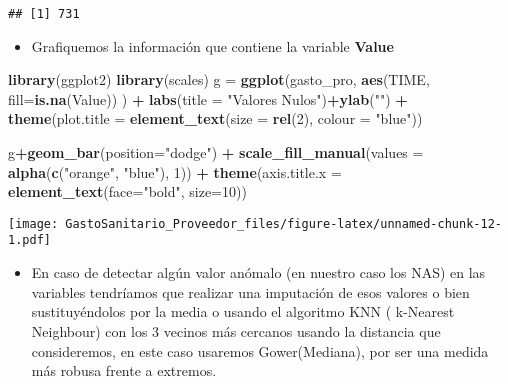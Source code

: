 \documentclass[]{article}
\newenvironment{Shaded}{\begin{snugshade}}{\end{snugshade}}
\newcommand{\DataTypeTok}[1]{\textcolor[rgb]{0.13,0.29,0.53}{#1}}
\newcommand{\DecValTok}[1]{\textcolor[rgb]{0.00,0.00,0.81}{#1}}
\newcommand{\KeywordTok}[1]{\textcolor[rgb]{0.13,0.29,0.53}{\textbf{#1}}}
\newcommand{\NormalTok}[1]{#1}
\newcommand{\OperatorTok}[1]{\textcolor[rgb]{0.81,0.36,0.00}{\textbf{#1}}}
\newcommand{\StringTok}[1]{\textcolor[rgb]{0.31,0.60,0.02}{#1}}
\providecommand{\tightlist}{%
  \setlength{\itemsep}{0pt}\setlength{\parskip}{0pt}}
\begin{document}
\begin{Shaded}
\end{Shaded}

\begin{verbatim}
## [1] 731
\end{verbatim}

\begin{itemize}
\tightlist
\item
  Grafiquemos la información que contiene la variable \textbf{Value}
\end{itemize}

\begin{Shaded}
\begin{Highlighting}[]
\KeywordTok{library}\NormalTok{(ggplot2)}
\KeywordTok{library}\NormalTok{(scales)}
\NormalTok{g =}\StringTok{ }\KeywordTok{ggplot}\NormalTok{(gasto_pro, }\KeywordTok{aes}\NormalTok{(TIME, }\DataTypeTok{fill=}\KeywordTok{is.na}\NormalTok{(Value)) ) }\OperatorTok{+}
\KeywordTok{labs}\NormalTok{(}\DataTypeTok{title =} \StringTok{"Valores Nulos"}\NormalTok{)}\OperatorTok{+}\KeywordTok{ylab}\NormalTok{(}\StringTok{""}\NormalTok{) }\OperatorTok{+}
\KeywordTok{theme}\NormalTok{(}\DataTypeTok{plot.title =} \KeywordTok{element_text}\NormalTok{(}\DataTypeTok{size =} \KeywordTok{rel}\NormalTok{(}\DecValTok{2}\NormalTok{), }\DataTypeTok{colour =} \StringTok{"blue"}\NormalTok{))}

\NormalTok{g}\OperatorTok{+}\KeywordTok{geom_bar}\NormalTok{(}\DataTypeTok{position=}\StringTok{"dodge"}\NormalTok{) }\OperatorTok{+}\StringTok{ }\KeywordTok{scale_fill_manual}\NormalTok{(}\DataTypeTok{values =} \KeywordTok{alpha}\NormalTok{(}\KeywordTok{c}\NormalTok{(}\StringTok{"orange"}\NormalTok{, }\StringTok{"blue"}\NormalTok{), }\DecValTok{1}\NormalTok{)) }\OperatorTok{+}
\KeywordTok{theme}\NormalTok{(}\DataTypeTok{axis.title.x =} \KeywordTok{element_text}\NormalTok{(}\DataTypeTok{face=}\StringTok{"bold"}\NormalTok{, }\DataTypeTok{size=}\DecValTok{10}\NormalTok{))}
\end{Highlighting}
\end{Shaded}

\texttt{[image: GastoSanitario\_Proveedor\_files/figure-latex/unnamed-chunk-12-1.pdf]}

\begin{itemize}
\tightlist
\item
  En caso de detectar algún valor anómalo (en nuestro caso los NAS) en
  las variables tendríamos que realizar una imputación de esos valores o
  bien sustituyéndolos por la media o usando el algoritmo KNN (
  k-Nearest Neighbour) con los 3 vecinos más cercanos usando la
  distancia que consideremos, en este caso usaremos Gower(Mediana), por
  ser una medida más robusa frente a extremos.
\end{itemize}
\end{document}
